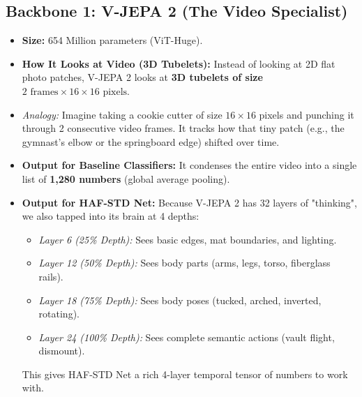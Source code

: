 \documentclass[a4paper, 11pt]{article}
\begin{document}
\subsection{Backbone 1: V-JEPA 2 (The Video Specialist)}
\begin{itemize}
    \item \textbf{Size:} 654 Million parameters (ViT-Huge).
    \item \textbf{How It Looks at Video (3D Tubelets):} Instead of looking at 2D flat photo patches, V-JEPA 2 looks at \textbf{3D tubelets of size $2 \text{ frames} \times 16 \times 16 \text{ pixels}$}. 
    \item \textit{Analogy:} Imagine taking a cookie cutter of size $16 \times 16$ pixels and punching it through 2 consecutive video frames. It tracks how that tiny patch (e.g., the gymnast's elbow or the springboard edge) shifted over time.
    \item \textbf{Output for Baseline Classifiers:} It condenses the entire video into a single list of \textbf{1,280 numbers} (global average pooling).
    \item \textbf{Output for HAF-STD Net:} Because V-JEPA 2 has 32 layers of "thinking", we also tapped into its brain at 4 depths:
    \begin{itemize}
        \item \textit{Layer 6 (25\% Depth):} Sees basic edges, mat boundaries, and lighting.
        \item \textit{Layer 12 (50\% Depth):} Sees body parts (arms, legs, torso, fiberglass rails).
        \item \textit{Layer 18 (75\% Depth):} Sees body poses (tucked, arched, inverted, rotating).
        \item \textit{Layer 24 (100\% Depth):} Sees complete semantic actions (vault flight, dismount).
    \end{itemize}
    This gives HAF-STD Net a rich 4-layer temporal tensor of numbers to work with.
\end{itemize}
\end{document}
